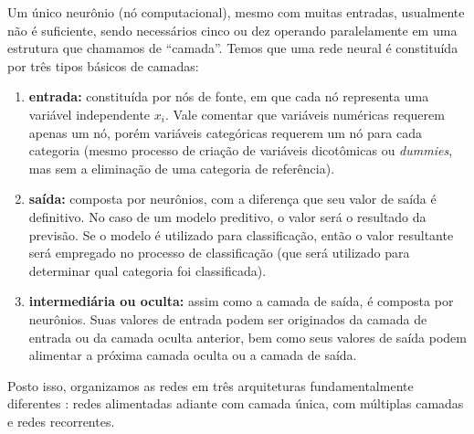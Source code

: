 \documentclass{automatextcc}
\begin{document}

Um único neurônio (nó computacional), mesmo com muitas entradas, usualmente não é suficiente, sendo necessários cinco ou dez operando paralelamente em uma estrutura que chamamos de ``camada''. Temos que uma rede neural é constituída por três tipos básicos de camadas:

\begin{enumerate}
    \item \textbf{entrada:} constituída por nós de fonte, em que cada nó representa uma variável independente $x_i$. Vale comentar que variáveis numéricas requerem apenas um nó, porém variáveis categóricas requerem um nó para cada categoria (mesmo processo de criação de variáveis dicotômicas ou \textit{dummies}, mas sem a eliminação de uma categoria de referência).
    \item \textbf{saída:} composta por neurônios, com a diferença que seu valor de saída é definitivo. No caso de um modelo preditivo, o valor será o resultado da previsão. Se o modelo é utilizado para classificação, então o valor resultante será empregado no processo de classificação (que será utilizado para determinar qual categoria foi classificada).
    \item \textbf{intermediária ou oculta:} assim como a camada de saída, é composta por neurônios. Suas valores de entrada podem ser originados da camada de entrada ou da camada oculta anterior, bem como seus valores de saída podem alimentar a próxima camada oculta ou a camada de saída.
\end{enumerate}
Posto isso, organizamos as redes em três arquiteturas fundamentalmente diferentes \citep{haykin2001,hair2005,hagan2014}: redes alimentadas adiante com camada única, com múltiplas camadas e redes recorrentes.
\end{document}
